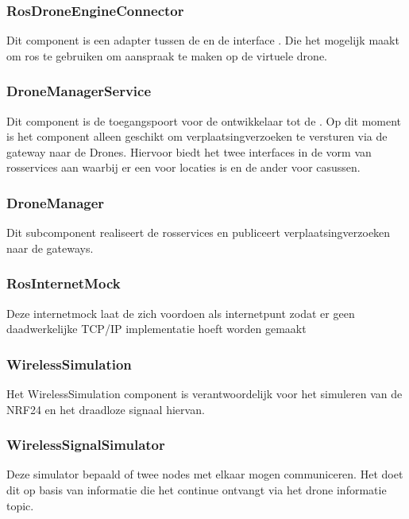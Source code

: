\documentclass[a4paper, 11pt, oneside]{report}
\begin{document}
\subsubsection{RosDroneEngineConnector}
\label{architectural:subcomponenten:RosDroneEngineConnector}
Dit component is een adapter tussen de  en de interface . Die het mogelijk maakt om ros te gebruiken om aanspraak te maken op de virtuele drone.

\subsubsection{DroneManagerService}
\label{architectural:subcomponenten:DroneManagerService}
Dit component is de toegangspoort voor de ontwikkelaar tot de .
Op dit moment is het component alleen geschikt om verplaatsingverzoeken te versturen via de gateway naar de Drones.
Hiervoor biedt het twee interfaces in de vorm van rosservices aan waarbij er een voor locaties is en de ander voor casussen. 

\subsubsection{DroneManager}
\label{architectural:subcomponenten:DroneManager}
Dit subcomponent realiseert de rosservices en publiceert verplaatsingverzoeken naar de gateways.  

\subsubsection{RosInternetMock}
\label{architectural:subcomponenten:RosInternetMock}
Deze internetmock laat de  zich voordoen als internetpunt zodat er geen daadwerkelijke TCP/IP implementatie hoeft worden gemaakt 
\subsubsection{WirelessSimulation}
\label{architectural:subcomponenten:WirelessSimulation}
Het WirelessSimulation component is verantwoordelijk voor het simuleren van de NRF24 en het draadloze signaal hiervan. 
\subsubsection{WirelessSignalSimulator}
\label{architectural:subcomponenten:WirelessSignalSimulator}
Deze simulator bepaald of twee nodes met elkaar mogen communiceren. Het doet dit op basis van informatie die het continue ontvangt via het drone informatie topic. 
\end{document}
